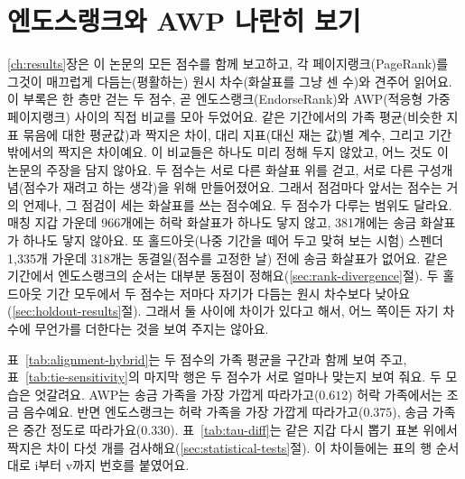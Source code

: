 \section{엔도스랭크와 AWP 나란히 보기}
\label{ch:appendix-er-awp}

\ref{ch:results}장은 이 논문의 모든 점수를 함께 보고하고, 각 페이지랭크(PageRank)를 그것이 매끄럽게 다듬는(평활하는) 원시 차수(화살표를 그냥 센 수)와 견주어 읽어요. 이 부록은 한 층만 걷는 두 점수, 곧 엔도스랭크(EndorseRank)와 AWP(적응형 가중 페이지랭크) 사이의 직접 비교를 모아 두었어요. 같은 기간에서의 가족 평균(비슷한 지표 묶음에 대한 평균값)과 짝지은 차이, 대리 지표(대신 재는 값)별 계수, 그리고 기간 밖에서의 짝지은 차이예요. 이 비교들은 하나도 미리 정해 두지 않았고, 어느 것도 이 논문의 주장을 담지 않아요. 두 점수는 서로 다른 화살표 위를 걷고, 서로 다른 구성개념(점수가 재려고 하는 생각)을 위해 만들어졌어요. 그래서 점검마다 앞서는 점수는 거의 언제나, 그 점검이 세는 화살표를 쓰는 점수예요. 두 점수가 다루는 범위도 달라요. 매칭 지갑 가운데 966개에는 허락 화살표가 하나도 닿지 않고, 381개에는 송금 화살표가 하나도 닿지 않아요. 또 홀드아웃(나중 기간을 떼어 두고 맞혀 보는 시험) 스펜더 1,335개 가운데 318개는 동결일(점수를 고정한 날) 전에 송금 화살표가 없어요. 같은 기간에서 엔도스랭크의 순서는 대부분 동점이 정해요(\ref{sec:rank-divergence}절). 두 홀드아웃 기간 모두에서 두 점수는 저마다 자기가 다듬는 원시 차수보다 낮아요(\ref{sec:holdout-results}절). 그래서 둘 사이에 차이가 있다고 해서, 어느 쪽이든 자기 차수에 무언가를 더한다는 것을 보여 주지는 않아요.


표~\ref{tab:alignment-hybrid}는 두 점수의 가족 평균을 구간과 함께 보여 주고, 표~\ref{tab:tie-sensitivity}의 마지막 행은 두 점수가 서로 얼마나 맞는지 보여 줘요. 두 모습은 엇갈려요. AWP는 송금 가족을 가장 가깝게 따라가고($0.612$) 허락 가족에서는 조금 음수예요. 반면 엔도스랭크는 허락 가족을 가장 가깝게 따라가고($0.375$), 송금 가족은 중간 정도로 따라가요($0.330$). 표~\ref{tab:tau-diff}는 같은 지갑 다시 뽑기 표본 위에서 짝지은 차이 다섯 개를 검사해요(\ref{sec:statistical-tests}절). 이 차이들에는 표의 행 순서대로 i부터 v까지 번호를 붙였어요.



